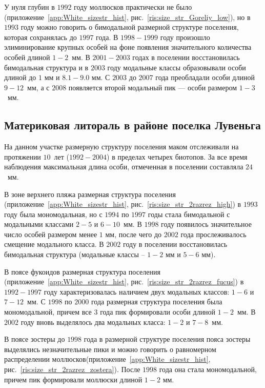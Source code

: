 У нуля глубин в $1992$ году моллюсков практически не было (приложение~\ref{app:White_sizestr_hist}, рис.~\ref{ris:size_str_Goreliy_low}), но в $1993$ году можно говорить о бимодальной размерной структуре поселения, которая сохранялась до $1997$ года. 
В $1998-1999$ году произошло элиминирование крупных особей на фоне появления значительного количества особей длиной $1-2$~мм. 
В $2001-2003$ годах в поселении восстановилась бимодальная структура и в $2003$ году модальные классы образовывали особи длиной до $1$ мм и $8.1-9.0$ мм. 
С $2003$ до $2007$ года преобладали особи длиной $9-12$~мм, а с $2008$ появляется второй модальный пик --- особи размером $1-3$~мм.


		\subsection*{Материковая литораль в районе поселка Лувеньга}
На данном участке размерную структуру поселения маком отслеживали на протяжении $10$~лет ($1992 - 2004$) в пределах четырех биотопов.
За все время наблюдения максимальная длина особи, отмеченная в поселении составляла $24$~мм.

В зоне верхнего пляжа размерная структура поселения (приложение~\ref{app:White_sizestr_hist}, рис.~\ref{ris:size_str_2razrez_high}) в $1993$ году была мономодальная, но с $1994$ по $1997$ годы стала бимодальной с модальными классами $2-5$ и $6-10$~мм.
В $1998$ году появилось значительное число особей размером менее $1$ мм, после чего до $2002$ года прослеживалось смещение модального класса. 
В $2002$ году в поселении восстановилась бимодальная структура (модальные классы -- $1-2$ мм и $5-6$ мм).

В поясе фукоидов размерная структура поселения (приложение~\ref{app:White_sizestr_hist}, рис.~\ref{ris:size_str_2razrez_fucus}) в $1992-1997$ году характеризовалась наличием двух модальных классов: $1-6$ и $7-12$~мм. 
С $1998$ по $2000$ года размерная структура поселения была мономодальной, причем все $3$ года пик формировали особи длиной $1-2$~мм. 
В $2002$ году вновь выделялось два модальных класса: $1-2$ и $7-8$~мм.

В поясе зостеры до $1998$ года в размерной структуре поселения пояса зостеры выделялись незначительные пики и можно говорить о равномерном распределении моллюсков(приложение~\ref{app:White_sizestr_hist}, рис.~\ref{ris:size_str_2razrez_zostera}). 
После $1998$ года она стала мономодальной, причем пик формировали моллюски длиной $1-2$ мм.


